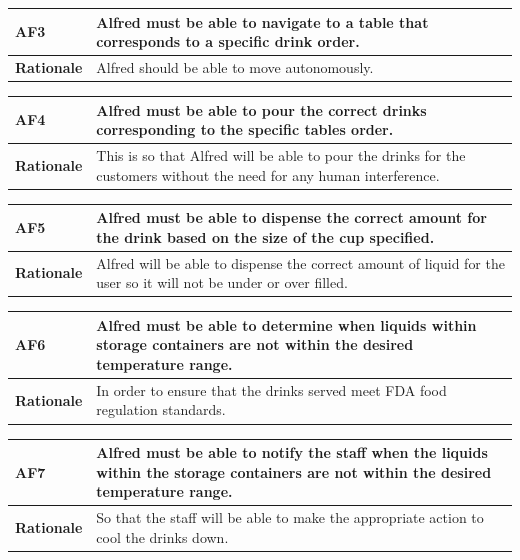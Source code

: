 \documentclass [11pt]{article}
\begin{document}
\begin{longtable}{| p{ } | p{ } | }\hline 
\rowcolor{tableCell}\textbf{AF3} &  Alfred must be able to navigate to a table that corresponds to a specific drink order. \\ \hline
\textbf{Rationale} & Alfred should be able to move autonomously. \\ \hline 
\end{longtable}

\begin{longtable}{| p{ } | p{ } | }\hline 
\rowcolor{tableCell}\textbf{AF4} & Alfred must be able to pour the correct drinks corresponding to the specific tables order.\\ \hline
\textbf{Rationale} &  This is so that Alfred will be able to pour the drinks for the customers without the need for any human interference. \\ \hline 
\end{longtable}

\begin{longtable}{| p{ } | p{ } | }\hline 
\rowcolor{tableCell}\textbf{AF5} & Alfred must be able to dispense the correct amount for the drink based on the size of the cup specified.\\ \hline
\textbf{Rationale} &  Alfred will be able to dispense the correct amount of liquid for the user so it will not be under or over filled. \\ \hline 
\end{longtable}

\begin{longtable}{| p{ } | p{ } | }\hline 
\rowcolor{tableCell}\textbf{AF6} & Alfred must be able to determine when liquids within storage containers are not within the desired temperature range.\\ \hline
\textbf{Rationale} &  In order to ensure that the drinks served meet FDA food regulation standards. \\ \hline 
\end{longtable}

\begin{longtable}{| p{ } | p{ } | }\hline 
\rowcolor{tableCell}\textbf{AF7} & Alfred must be able to notify the staff when the liquids within the storage containers are not within the desired temperature range.\\ \hline
\textbf{Rationale} &  So that the staff will be able to make the appropriate action to cool the drinks down.\\ \hline 
\end{longtable}
\end{document}

